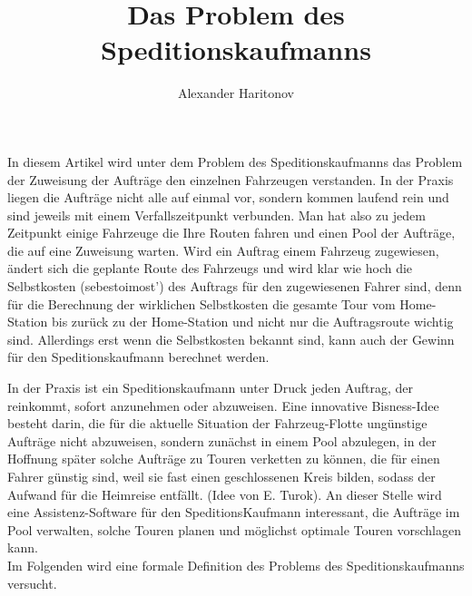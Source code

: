 \documentclass{article}
\title{Das Problem des Speditionskaufmanns}
\author{Alexander Haritonov}
\begin{document}
\maketitle

In diesem Artikel wird unter dem Problem des Speditionskaufmanns das Problem der Zuweisung der Aufträge den einzelnen Fahrzeugen verstanden.
In der Praxis liegen die Aufträge nicht alle auf einmal vor, sondern kommen laufend rein und sind jeweils mit einem Verfallszeitpunkt verbunden.
Man hat also zu jedem Zeitpunkt einige Fahrzeuge die Ihre Routen fahren und einen Pool der Aufträge, die auf eine Zuweisung warten. 
Wird ein Auftrag einem Fahrzeug zugewiesen, ändert sich die geplante Route des Fahrzeugs und wird klar wie hoch die Selbstkosten (sebestoimost') des Auftrags für den zugewiesenen Fahrer sind, denn für die Berechnung der wirklichen Selbstkosten die gesamte Tour vom Home-Station bis zurück zu der Home-Station und nicht nur die Auftragsroute wichtig sind. Allerdings erst wenn die Selbstkosten bekannt sind, kann auch der Gewinn für den Speditionskaufmann berechnet werden.

In der Praxis ist ein Speditionskaufmann unter Druck jeden Auftrag, der reinkommt, sofort anzunehmen oder abzuweisen. Eine innovative Bisness-Idee besteht darin, die für die aktuelle Situation der Fahrzeug-Flotte ungünstige Aufträge nicht abzuweisen, sondern zunächst in einem Pool abzulegen, in der Hoffnung später solche Aufträge zu Touren verketten zu können, die für einen Fahrer günstig sind, weil sie fast einen geschlossenen Kreis bilden, sodass der Aufwand für die Heimreise entfällt. (Idee von E. Turok). An dieser Stelle wird eine Assistenz-Software für den SpeditionsKaufmann interessant, die Aufträge im Pool verwalten, solche Touren planen und möglichst optimale Touren vorschlagen kann. \\

Im Folgenden wird eine formale Definition des Problems des Speditionskaufmanns versucht.
\\
\end{document}
